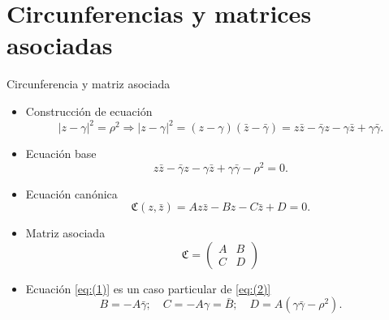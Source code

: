 \documentclass{beamer}
\begin{document}
\section{Circunferencias y matrices asociadas}
    
\begin{frame}{Circunferencia y matriz asociada}
    \begin{itemize}
        \item Construcción de ecuación
        \begin{equation*}
            |z-\gamma|^2=\rho^2 \Rightarrow |z-\gamma|^2=(z-\gamma)(\bar{z}-\bar{\gamma})=z\bar{z}-\bar{\gamma}z-\gamma\bar{z}+\gamma\bar{\gamma}.
        \end{equation*}
        \item Ecuación base
        \begin{equation}
            z\bar{z}-\bar{\gamma}z-\gamma\bar{z}+\gamma\bar{\gamma}-\rho^2=0.
            \label{eq:(1)}
        \end{equation}
        \item Ecuación canónica 
        \begin{equation}
            \mathfrak{C}(z,\bar{z})=Az\bar{z}-Bz-C\bar{z}+D=0.
            \label{eq:(2)}
        \end{equation}
        \item Matriz asociada
        \begin{equation}
            \mathfrak{C}=
            \begin{pmatrix}
                A & B \\
                C & D 
            \end{pmatrix}
            \label{eq:(3)}
        \end{equation}
        \item Ecuación \eqref{eq:(1)} es un caso particular de \eqref{eq:(2)}
        \begin{equation}
            B=-A\bar{\gamma};\quad C=-A\gamma = \bar{B}; \quad D = A(\gamma\bar{\gamma}-\rho^2). 
            \label{eq:(4)}
        \end{equation}
    \end{itemize}
\end{frame}
\end{document}
